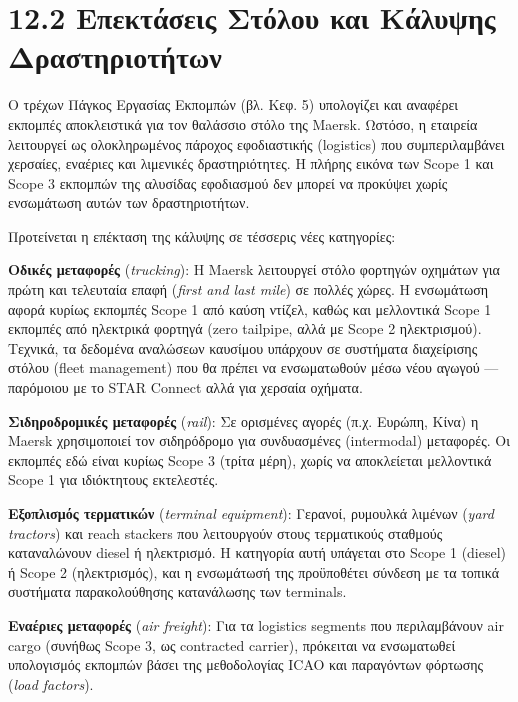 \documentclass[11pt,a4paper,greek,twoside]{template-xe}
\begin{document}
\section{12.2 Επεκτάσεις Στόλου και Κάλυψης
Δραστηριοτήτων}\label{ux3b5ux3c0ux3b5ux3baux3c4ux3acux3c3ux3b5ux3b9ux3c2-ux3c3ux3c4ux3ccux3bbux3bfux3c5-ux3baux3b1ux3b9-ux3baux3acux3bbux3c5ux3c8ux3b7ux3c2-ux3b4ux3c1ux3b1ux3c3ux3c4ux3b7ux3c1ux3b9ux3bfux3c4ux3aeux3c4ux3c9ux3bd}

Ο τρέχων Πάγκος Εργασίας Εκπομπών (βλ. Κεφ. 5) υπολογίζει και αναφέρει
εκπομπές αποκλειστικά για τον θαλάσσιο στόλο της Maersk. Ωστόσο, η
εταιρεία λειτουργεί ως ολοκληρωμένος πάροχος εφοδιαστικής (logistics)
που συμπεριλαμβάνει χερσαίες, εναέριες και λιμενικές δραστηριότητες. Η
πλήρης εικόνα των Scope 1 και Scope 3 εκπομπών της αλυσίδας εφοδιασμού
δεν μπορεί να προκύψει χωρίς ενσωμάτωση αυτών των δραστηριοτήτων.

Προτείνεται η επέκταση της κάλυψης σε τέσσερις νέες κατηγορίες:

\textbf{Οδικές μεταφορές} (\emph{trucking}): Η Maersk λειτουργεί στόλο
φορτηγών οχημάτων για πρώτη και τελευταία επαφή (\emph{first and last
mile}) σε πολλές χώρες. Η ενσωμάτωση αφορά κυρίως εκπομπές Scope 1 από
καύση ντίζελ, καθώς και μελλοντικά Scope 1 εκπομπές από ηλεκτρικά
φορτηγά (zero tailpipe, αλλά με Scope 2 ηλεκτρισμού). Τεχνικά, τα
δεδομένα αναλώσεων καυσίμου υπάρχουν σε συστήματα διαχείρισης στόλου
(fleet management) που θα πρέπει να ενσωματωθούν μέσω νέου αγωγού ---
παρόμοιου με το STAR Connect αλλά για χερσαία οχήματα.

\textbf{Σιδηροδρομικές μεταφορές} (\emph{rail}): Σε ορισμένες αγορές
(π.χ. Ευρώπη, Κίνα) η Maersk χρησιμοποιεί τον σιδηρόδρομο για
συνδυασμένες (intermodal) μεταφορές. Οι εκπομπές εδώ είναι κυρίως Scope
3 (τρίτα μέρη), χωρίς να αποκλείεται μελλοντικά Scope 1 για ιδιόκτητους
εκτελεστές.

\textbf{Εξοπλισμός τερματικών} (\emph{terminal equipment}): Γερανοί,
ρυμουλκά λιμένων (\emph{yard tractors}) και reach stackers που
λειτουργούν στους τερματικούς σταθμούς καταναλώνουν diesel ή ηλεκτρισμό.
Η κατηγορία αυτή υπάγεται στο Scope 1 (diesel) ή Scope 2 (ηλεκτρισμός),
και η ενσωμάτωσή της προϋποθέτει σύνδεση με τα τοπικά συστήματα
παρακολούθησης κατανάλωσης των terminals.

\textbf{Εναέριες μεταφορές} (\emph{air freight}): Για τα logistics
segments που περιλαμβάνουν air cargo (συνήθως Scope 3, ως contracted
carrier), πρόκειται να ενσωματωθεί υπολογισμός εκπομπών βάσει της
μεθοδολογίας ICAO και παραγόντων φόρτωσης (\emph{load factors}).
\end{document}
